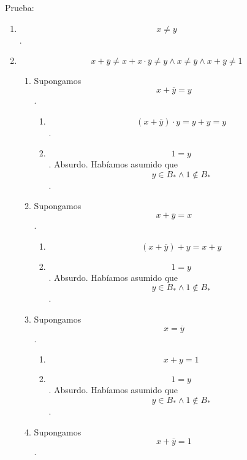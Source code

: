 \begin{enumerate}
\begin{enumerate}
\begin{enumerate}
      Prueba:

      \begin{enumerate}
      \def\labelenumiv{\arabic{enumiv}.}
      \item
        \[x \neq y\].
      \item
        \[{{{{x + \overline{y}} \neq {x + {x \cdot \overline{y}}}} \neq {y \land x}} \neq {{\overline{y} \land x} + \overline{y}}} \neq 1\]

        \begin{enumerate}
        \def\labelenumv{\arabic{enumv}.}
        \item
          Supongamos \[{x + \overline{y}} = y\].

          \begin{enumerate}
          \def\labelenumvi{\arabic{enumvi}.}
          \tightlist
          \item
            \[{{{({x + \overline{y}})} \cdot y} = {y + y}} = y\].
          \item
            \[1 = y\]. Absurdo. Habíamos asumido que
            \[{y \in {B_{\ast} \land 1}} \notin B_{\ast}\].
          \end{enumerate}
        \item
          Supongamos \[{x + \overline{y}} = x\].

          \begin{enumerate}
          \def\labelenumvi{\arabic{enumvi}.}
          \tightlist
          \item
            \[{{({x + \overline{y}})} + y} = {x + y}\]
          \item
            \[1 = y\]. Absurdo. Habíamos asumido que
            \[{y \in {B_{\ast} \land 1}} \notin B_{\ast}\].
          \end{enumerate}
        \item
          Supongamos \[x = \overline{y}\].

          \begin{enumerate}
          \def\labelenumvi{\arabic{enumvi}.}
          \tightlist
          \item
            \[{x + y} = 1\]
          \item
            \[1 = y\]. Absurdo. Habíamos asumido que
            \[{y \in {B_{\ast} \land 1}} \notin B_{\ast}\].
          \end{enumerate}
        \item
          Supongamos \[{x + \overline{y}} = 1\].


\end{enumerate}
\end{enumerate}
\end{enumerate}
\end{enumerate}
\end{enumerate}
